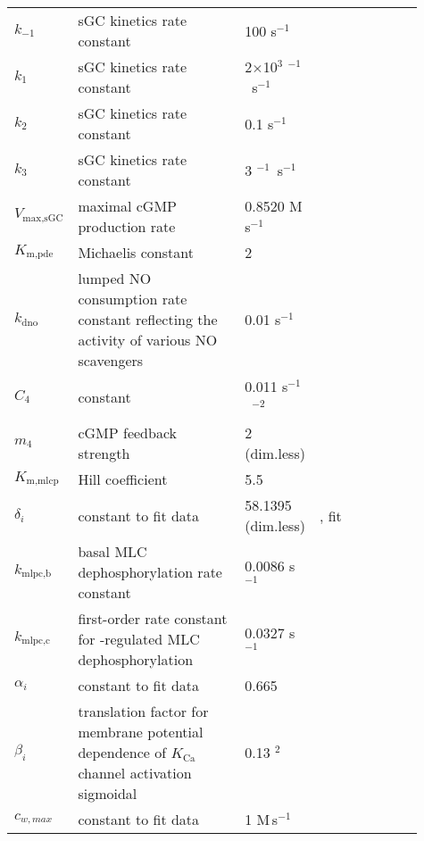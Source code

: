 \documentclass[fleqn]{report}
\numberwithin{equation}{section}
\numberwithin{equation}{section}
\newcommand{\cGMP}{\text{cGMP}}
\newcommand{\uMpers}{\textmu M\,s$^{-1}$}
\newcommand\e[1]{$\times$10$^{#1}$}
\newcommand{\n}{$^{-1}$}
\begin{document}
							\begin{table}[h!] \label{tab:sGC}
								\centering
								\begin{tabular}{ p{0.1\linewidth}  >{\footnotesize} p{0.41\linewidth}  >{\footnotesize} p{0.14\linewidth} >{\footnotesize} p{0.26\linewidth} }
									\hline
									$ k_{-1} $ 				& sGC kinetics rate constant 	& 100 s\n 				& \citep{Yang2005} \\ 
									$ k_1 $ 				& sGC kinetics rate constant 	& 2\e{3} \uM\n\ s\n 		& \citep{Yang2005} \\ 
									$ k_2 $ 				& sGC kinetics rate constant 	& 0.1 s\n 				& \citep{Yang2005} \\ 
									$ k_3 $ 				& sGC kinetics rate constant 	& 3 \uM\n\ s\n 			& \citep{Yang2005} \\ 
									$ V_{\text{max,sGC}} $ 	& maximal cGMP production rate	& 0.8520 \uMpers  		& \citep{Yang2005} \\ 
									$ K_{\text{m,pde}} $ 	& Michaelis constant 			& 2 \uM 				& \citep{Yang2005} \\ 
									$ k_{\text{dno}}$ 		& lumped NO consumption rate constant reflecting the activity of various NO scavengers & 0.01 s\n & \citep{Yang2005} \\ 
									$ C_4 $ 				& constant 						& 0.011 s\n\ \uM$^{-2}$ 	& \citep{Yang2005} \\ 
									$ m_4 $ 				& cGMP feedback strength 		& 2 (dim.less) 			& \citep{Yang2005} \\
									$ K_{\text{m,mlcp}} $ 	& Hill coefficient				& 5.5 \uM 				& \citep{Yang2005} \\
									$ \delta_i $ 			& constant to fit data			& 58.1395 (dim.less)	& \citep{Hai1988}, fit\\
									$ k_{\text{mlpc,b}} $ 	& basal MLC dephosphorylation rate constant			& 0.0086 s\n  			& \citep{Yang2005} \\
									$ k_{\text{mlpc,c}} $ 	& first-order rate constant for \cGMP-regulated MLC dephosphorylation		& 0.0327 s\n 			& \citep{Yang2005} \\
									$ \alpha_i $ 			& constant to fit data			& 0.665 \uM  		&  \citep{Stockand1996}\\  %
									$ \beta_i $ 			& translation factor for membrane potential dependence of $ K_{\text{Ca}} $ channel activation sigmoidal & 0.13 \uM$^2$ & \citep{Koenigsberger2006} \\ 
									$ c_{w,max} $ 			& constant to fit data & 1 \uMpers & \citep{Stockand1996}\\ 

\end{tabular}
\end{table}
\end{document}
